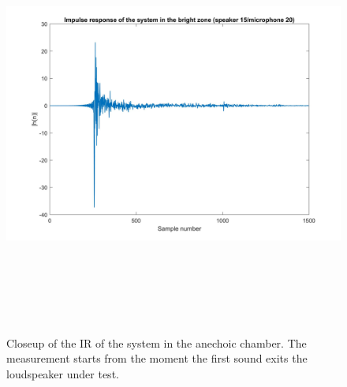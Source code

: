 \begin{figure}[H]
\centering
\includegraphics[width=14.5cm,height=14cm,keepaspectratio]{Figures/ir_bright}
\decoRule
\caption[Impulse response of the anechoic chamber]{Closeup of the IR of the system in the anechoic chamber. The measurement starts from the moment the first sound exits the loudspeaker under test. }
\label{fig:ir_bright}
\end{figure}

